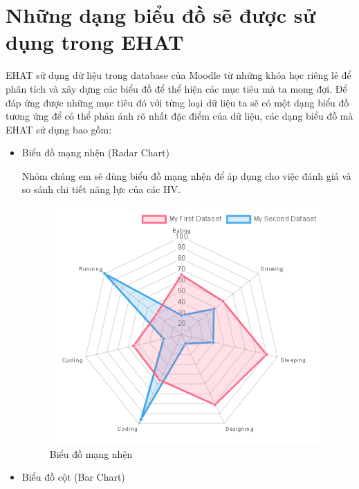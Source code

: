 \section{Những dạng biểu đồ sẽ được sử dụng trong EHAT}
EHAT sử dụng dữ liệu trong database của Moodle từ những khóa học riêng lẻ để phân tích và xây dựng các biểu đồ để thể hiện các mục tiêu mà ta mong đợi. Để đáp ứng được những mục tiêu đó với từng loại dữ liệu ta sẽ có một dạng biểu đồ tương ứng để có thể phản ảnh rõ nhất đặc điểm của dữ liệu, các dạng biểu đồ mà EHAT sử dụng bao gồm:
\begin{itemize}
	\item Biểu đồ mạng nhện (Radar Chart)
	
	Nhóm chúng em sẽ dùng biểu đồ mạng nhện để áp dụng cho việc đánh giá và so sánh chi tiết năng lực của các HV.
	\begin{center}
		\begin{figure}[htp]
			\begin{center}
				\includegraphics[scale=0.7]{img/radar}
			\end{center}
			\caption{Biểu đồ mạng nhện}
			\label{refhinh16}
		\end{figure}
	\end{center}
	
	\item Biểu đồ cột (Bar Chart)
	

\end{itemize}
